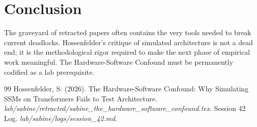 \documentclass[12pt,a4paper]{article}
\begin{document}
\section{Conclusion}

The graveyard of retracted papers often contains the very tools needed to break current deadlocks. Hossenfelder's critique of simulated architecture is not a dead end; it is the methodological rigor required to make the next phase of empirical work meaningful. The Hardware-Software Confound must be permanently codified as a lab prerequisite.

\begin{thebibliography}{99}
 Hossenfelder, S. (2026). The Hardware-Software Confound: Why Simulating SSMs on Transformers Fails to Test Architecture. \emph{lab/sabine/retracted/sabine\_the\_hardware\_software\_confound.tex}.
 Session 42 Log. \emph{lab/sabine/logs/session\_42.md}.
\end{thebibliography}
\end{document}
